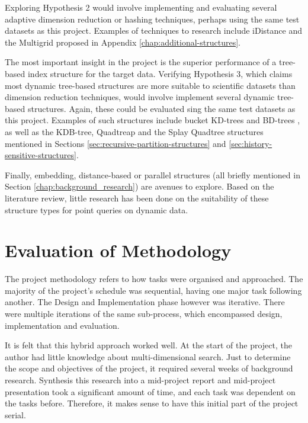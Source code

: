 Exploring Hypothesis 2 would involve implementing and evaluating several adaptive dimension reduction or hashing techniques, perhaps using the same test datasets as this project. Examples of techniques to research include iDistance \cite{idistance} and the Multigrid proposed in Appendix \ref{chap:additional-structures}.

The most important insight in the project is the superior performance of a tree-based index structure for the target data. Verifying Hypothesis 3, which claims most dynamic tree-based structures are more suitable to scientific datasets than dimension reduction techniques, would involve implement several dynamic tree-based structures. Again, these could be evaluated sing the same test datasets as this project. Examples of such structures include bucket KD-trees and BD-trees \cite{kdtree-v-bdtree}, as well as the KDB-tree, Quadtreap and the Splay Quadtree structures mentioned in Sections \ref{sec:recursive-partition-structures} and \ref{sec:history-sensitive-structures}.

Finally, embedding, distance-based or parallel structures (all briefly mentioned in Section \ref{chap:background_research}) are avenues to explore. Based on the literature review, little research has been done on the suitability of these structure types for point queries on dynamic data.

\section{Evaluation of Methodology}

The project methodology refers to how tasks were organised and approached. The majority of the project's schedule was sequential, having one major task following another. The Design and Implementation phase however was iterative. There were multiple iterations of the same sub-process, which encompassed design, implementation and evaluation. 

It is felt that this hybrid approach worked well. At the start of the project, the author had little knowledge about multi-dimensional search. Just to determine the scope and objectives of the project, it required several weeks of background research. Synthesis this research into a mid-project report and mid-project presentation took a significant amount of time, and each task was dependent on the tasks before. Therefore, it makes sense to have this initial part of the project serial.

